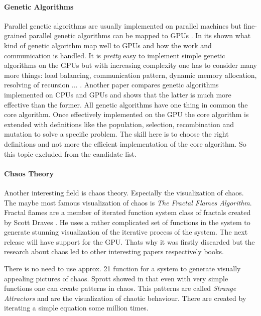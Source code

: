 \paragraph{Genetic Algorithms} %
\label{par:genetic_algorithms}
Parallel genetic algorithms are usually implemented on parallel machines but
fine-grained parallel genetic algorithms can be mapped to GPUs
\cite{citeulike:3801879}. In \cite{citeulike:3801866} its shown what kind of
genetic algorithm map well to GPUs and how the work and communication is
handled. It is \emph{pretty} easy to implement simple genetic algorithms on the
GPUs but with increasing complexity one has to consider many more things: load
balancing, communication pattern, dynamic memory allocation, resolving of
recursion ... . Another paper \cite{citeulike:3801883} compares genetic
algorithms implemented on CPUs and GPUs and shows that the latter is much more
effective than the former. All genetic algorithms have one thing in common the
core algorithm. Once effectively implemented on the \gls{GPU} the core algorithm is
extended with definitions like the population, selection, recombination and
mutation to solve a specific problem. The skill here is to choose the right
definitions and not more the efficient implementation of the core algorithm. So
this topic excluded from the candidate list.

\paragraph{Chaos Theory} %
\label{par:chaos_theory}
Another interesting field is chaos theory. Especially the visualization of
chaos. The maybe most famous visualization of chaos is \emph{The Fractal Flames
Algorithm}. Fractal flames are a member of iterated function system class of
fractals created by Scott Draves \cite{citeulike:3801950}. He uses a rather
complicated set of functions in the system to generate stunning visualization of
the iterative process of the system. The next release will have support for the
GPU. Thats why it was firstly discarded but the research about chaos led to
other interesting papers respectively books.

There is no need to use approx. 21 function for a system to generate visually
appealing pictures of chaos. Sprott showed in \cite{citeulike:3745535} that even
with very simple functions one can create patterns in chaos. This patterns are
called \emph{Strange Attractors} and are the visualization of chaotic behaviour.
There are created by iterating a simple equation some million times. 

